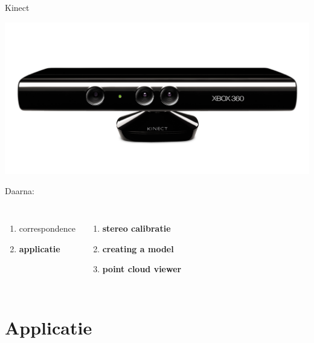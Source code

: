 \documentclass{beamer}
\begin{document}
\begin{frame}{Kinect}{}
\centerline{
\includegraphics[scale=0.3, viewport= 40 120 1190 460, clip=true]{kinect.jpg}
}
\vfill
Daarna:\\
\begin{columns}
\begin{enumerate}
\item correspondence
\item \textbf{applicatie}
\end{enumerate}
\begin{enumerate}
\item \textbf{stereo calibratie}
\item \textbf{creating a model}
\item \textbf{point cloud viewer}
\end{enumerate}
\end{columns}
\end{frame}



\section{Applicatie}
\end{document}
